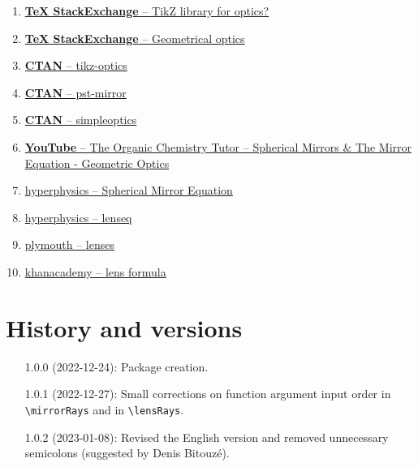 \documentclass[a4paper,10pt]{article}
\begin{document}
\begin{FHZmirroLensTcolorbox}
  \begin{enumerate}
    \item \href{https://tex.stackexchange.com/q/33460/140133}{\textbf{TeX StackExchange} -- TikZ library for optics?}
    \item \href{https://tex.stackexchange.com/q/623201/140133}{\textbf{TeX StackExchange} -- Geometrical optics}
    \item \href{https://ctan.org/pkg/tikz-optics}{{\textbf{CTAN}} -- tikz-optics}
    \item \href{https://ctan.org/pkg/pst-mirror}{\textbf{CTAN} -- pst-mirror}
    \item \href{https://ctan.org/pkg/simpleoptics}{\textbf{CTAN} -- simpleoptics}

    \item \href{https://youtu.be/efPZ5uSDeuI}{\textbf{YouTube} -- The Organic Chemistry Tutor -- Spherical Mirrors \& The Mirror Equation - Geometric Optics}
    \item \href{http://hyperphysics.phy-astr.gsu.edu/hbase/geoopt/mireq.html}{hyperphysics -- Spherical Mirror Equation}

    \item \href{http://hyperphysics.phy-astr.gsu.edu/hbase/geoopt/lenseq.html}{hyperphysics -- lenseq}
    \item \href{https://www.plymouth.ac.uk/uploads/production/document/path/3/3754/PlymouthUniversity_MathsandStats_outreach_lenses.pdf}{plymouth -- lenses}
    \item \href{https://www.khanacademy.org/science/in-in-class10th-physics/in-in-10th-physics-light-reflection-refraction/in-in-lens-formula-magnification/v/lens-formula}{khanacademy -- lens formula}
  \end{enumerate}
\end{FHZmirroLensTcolorbox}

\section{History and versions}

\begin{FHZmirroLensTcolorbox}
  \begin{enumerate}[leftmargin=3.5cm]
    \item[1.0.0 (2022-12-24):] Package creation.
    \item[1.0.1 (2022-12-27):] Small corrections on function argument input order in \verb|\mirrorRays| and in \verb|\lensRays|.
    \item[1.0.2 (2023-01-08):] Revised the English version and removed unnecessary semicolons (suggested by Denis Bitouzé).
  \end{enumerate}
\end{FHZmirroLensTcolorbox}
\end{document}
